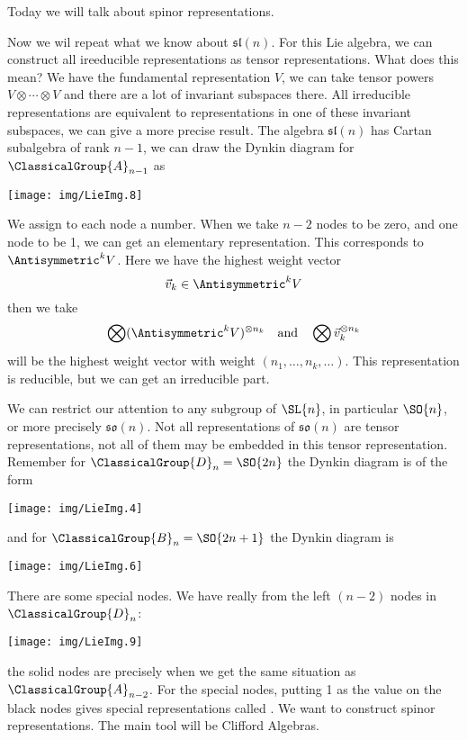 \noindent\ignorespaces %
Today we will talk about spinor representations.

Now we wil repeat what we know about $\mathfrak{sl}(n)$. For this
Lie algebra, we can construct all ireeducible representations as
tensor representations. What does this mean? We have the
fundamental representation $V$, we can take tensor powers
$V\otimes\cdots\otimes V$ and there are a lot of invariant
subspaces there. All irreducible representations are equivalent
to representations in one of these invariant subspaces, we can
give a more precise result. The algebra $\mathfrak{sl}(n)$ has
Cartan subalgebra of rank $n-1$, we can draw the Dynkin diagram
for $\ClassicalGroup{A}_{n-1}$ as
\begin{center}
\texttt{[image: img/LieImg.8]}
\end{center}
We assign to each node a number. When we take $n-2$ nodes to be
zero, and one node to be 1, we can get an elementary representation.
This corresponds to $\Antisymmetric^{k}V$. Here we have the
highest weight vector
\begin{equation}
\vec{v}_{k}\in\Antisymmetric^{k}V
\end{equation}
then we take
\begin{equation}
\bigotimes(\Antisymmetric^{k}V)^{\otimes
  n_{k}}\quad\mbox{and}\quad\bigotimes \vec{v}_{k}^{\otimes n_{k}}
\end{equation}
will be the highest weight vector with weight
$(n_{1},\dots,n_{k},\dots)$. This representation is reducible,
but we can get an irreducible part.

We can restrict our attention to any subgroup of $\SL{n}$, in
particular $\SO{n}$, or more precisely $\mathfrak{so}(n)$. Not
all representations of $\mathfrak{so}(n)$ are tensor
representations, not all of them may be embedded in this tensor
representation. Remember for $\ClassicalGroup{D}_{n}=\SO{2n}$ the
Dynkin diagram is of the form
\begin{center}
\texttt{[image: img/LieImg.4]}
\end{center}
and for $\ClassicalGroup{B}_{n}=\SO{2n+1}$ the Dynkin diagram is
\begin{center}
\texttt{[image: img/LieImg.6]}
\end{center}
There are some special nodes. We have really from the left
$(n-2)$ nodes in $\ClassicalGroup{D}_{n}$:
\begin{center}
\texttt{[image: img/LieImg.9]}
\end{center}
the solid nodes are precisely when we get the same situation as
$\ClassicalGroup{A}_{n-2}$. For the special nodes, putting 1 as
the value on the black nodes gives special representations called
. We want to construct spinor
representations. The main tool will be Clifford Algebras.

